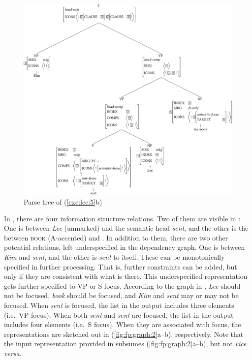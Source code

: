\begin{figure}
      \includegraphics[width=.9\textwidth]{pdf/fp-tree.pdf}
\caption{Parse tree of (\ref{exe:lee:5}b)}
\label{fig:fp:tree}
\end{figure}

 


In , there are four information structure
relations. Two of them are visible in : One is
 between \textit{Lee} (unmarked) and the semantic head
\textit{sent}, and the other is the  between
\textsc{book} (A-accented) and . In
addition to them, there are two other potential relations, left
underspecified in the dependency graph.  One is between \textit{Kim}
and \textit{sent}, and the other is \textit{sent} to itself. These can
be monotonically specified in further processing. That is, further
constraints can be added, but only if they are consistent with what is
there. This underspecified  representation gets further
specified to VP  or S focus.
According to the graph in , \textit{Lee} should
not be focused, \textit{book} should be focused, and \textit{Kim} and
\textit{sent} may or may not be focused.  When \textit{sent} is
focused, the  list in the output includes three 
elements (i.e.\ VP focus). When both \textit{sent} and \textit{sent}
are focused, the  list in the output includes four
 elements (i.e.\ S focus).  When they are associated with
focus, the representations are sketched out in
(\ref{fig:fp:graph:2}a--b), respectively.  Note that the input
representation provided in  subsumes
(\ref{fig:fp:graph:2}a--b), but not \textit{vice versa}.

